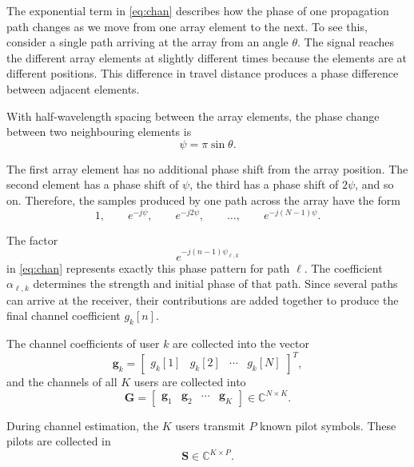 \documentclass[journal]{IEEEtran}
\newcommand{\bG}{\mathbf{G}}
\newcommand{\bS}{\mathbf{S}}
\newcommand{\bg}{\mathbf{g}}
\begin{document}
The exponential term in \eqref{eq:chan} describes how the phase of one
propagation path changes as we move from one array element to the next. To see
this, consider a single path arriving at the array from an angle $\theta$. The
signal reaches the different array elements at slightly different times because
the elements are at different positions. This difference in travel distance
produces a phase difference between adjacent elements.

With half-wavelength spacing between the array elements, the phase change
between two neighbouring elements is
\begin{equation}
\psi=\pi\sin\theta.
\end{equation}

The first array element has no additional phase shift from the array position.
The second element has a phase shift of $\psi$, the third has a phase shift of
$2\psi$, and so on. Therefore, the samples produced by one path across the
array have the form
\begin{equation}
1,\qquad e^{-j\psi},\qquad e^{-j2\psi},\qquad\ldots,\qquad e^{-j(N-1)\psi}.
\end{equation}

The factor
\begin{equation}
e^{-j(n-1)\psi_{\ell,k}}
\end{equation}
in \eqref{eq:chan} represents exactly this phase pattern for path $\ell$. The
coefficient $\alpha_{\ell,k}$ determines the strength and initial phase of that
path. Since several paths can arrive at the receiver, their contributions are
added together to produce the final channel coefficient $g_k[n]$.

The channel coefficients of user $k$ are collected into the vector
\begin{equation}
\bg_k=\begin{bmatrix}g_k[1]&g_k[2]&\cdots&g_k[N]\end{bmatrix}^T,
\end{equation}
and the channels of all $K$ users are collected into
\begin{equation}
\bG=\begin{bmatrix}\bg_1&\bg_2&\cdots&\bg_K\end{bmatrix}\in\mathbb{C}^{N\times K}.
\end{equation}

During channel estimation, the $K$ users transmit $P$ known pilot symbols.
These pilots are collected in
\begin{equation}
\bS\in\mathbb{C}^{K\times P}.
\end{equation}
\end{document}
